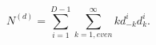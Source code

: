 \begin{equation}
N^{(d)}=\sum_{i=1}^{D-1}\sum_{k=1,even}^{\infty}kd_{-k}^{i}d_{k}^{i}.
\end{equation}

